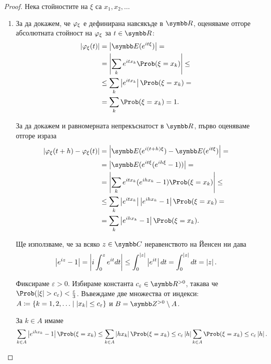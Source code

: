 \documentclass[numbers=endperiod, bibliography=totocnumbered]{scrartcl}
\begin{document}
\begin{proof}
  Нека стойностите на \( \xi \) са \( x_1, x_2, \ldots \)

  \begin{enumerate}
    \item За да докажем, че \( \varphi_\xi \) е дефинирана навсякъде в \( \R \), оценяваме отгоре абсолютната стойност на \( \varphi_\xi \) за \( t \in \R \):
    \begin{align*}
      \Abs{\Char_\xi(t)}
      &=
      \Abs{\Expect(e^{it\xi})}
      = \\ &=
      \Abs{\sum_k e^{it x_k} \Prob(\xi = x_k)}
      \leq \\ &\leq
      \sum_k \Abs{e^{it x_k}} \Prob(\xi = x_k)
      = \\ &=
      \sum_k \Prob(\xi = x_k)
      =
      1.
    \end{align*}

    За да докажем и равномерната непрекъснатост в \( \R \), първо оценяваме отгоре израза
    \begin{align*}
      \Abs{\Char_\xi(t + h) - \Char_\xi(t)}
      &=
      \Abs{\Expect(e^{i(t + h)\xi}) - \Expect(e^{it\xi})}
      = \\ &=
      \Abs{\Expect(e^{it\xi} (e^{ih\xi} - 1))}
      = \\ &=
      \Abs{\sum_k e^{it x_k} (e^{ih x_k} - 1) \Prob(\xi = x_k)}
      \leq \\ &\leq
      \sum_k \Abs{e^{it x_k}} \Abs{e^{ih x_k} - 1} \Prob(\xi = x_k)
      = \\ &=
      \sum_k \Abs{e^{ih x_k} - 1} \Prob(\xi = x_k).
    \end{align*}

    Ще използваме, че за всяко \( z \in \Complex \) неравенството на Йенсен ни дава
    \begin{equation*}
      \left\vert e^{iz} - 1 \right\vert
      =
      \left\vert i \int_0^z e^{it} dt \right\vert
      \leq
      \int_0^{\left\vert z \right\vert} \left\vert e^{it} \right\vert dt
      =
      \int_0^{\left\vert z \right\vert} dt
      =
      \left\vert z \right\vert.
    \end{equation*}

    Фиксираме \( \varepsilon > 0 \). Избираме константа \( c_\varepsilon \in \RPos \), такава че \( \Prob(\Abs{\xi} > c_\varepsilon) < \frac \varepsilon 3 \).
    Въвеждаме две множества от индекси: \( A \coloneqq \{ k = 1, 2, \ldots \mid \left\vert x_k \right\vert \leq c_\varepsilon \} \) и \( B = \ZPos \setminus A \).

    За \( k \in A \) имаме
    \begin{equation*}
      \sum_{k \in A} \Abs{e^{ih x_k} - 1} \Prob(\xi = x_k)
      \leq
      \sum_{k \in A} \Abs{h x_k} \Prob(\xi = x_k)
      \leq
      c_\varepsilon \Abs h \sum_{k \in A} \Prob(\xi = x_k)
      \leq
      c_\varepsilon \Abs h.
    \end{equation*}


\end{enumerate}
\end{proof}
\end{document}
